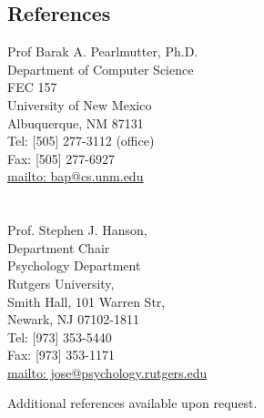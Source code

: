 \documentclass[10pt,overlapped,line]{res}
\begin{document}
\begin{resume}
 \section{References}
  \begin{multicols}{2}
 {\small
    Prof Barak A. Pearlmutter, Ph.D. \\
    Department of Computer Science \\
    FEC 157 \\
    University of New Mexico \\
    Albuquerque, NM  87131 \\
    Tel: [505] 277-3112 (office) \\
    Fax: [505] 277-6927 \\
    \href{URL}{mailto: bap@cs.unm.edu} \\
 \\
 \\
    Prof. Stephen J. Hanson, \\
    Department Chair \\
    Psychology Department \\
    Rutgers University, \\
    Smith Hall, 101 Warren Str, \\
    Newark, NJ 07102-1811 \\
    Tel: [973] 353-5440 \\
    Fax: [973] 353-1171 \\
    \href{URL}{mailto: jose@psychology.rutgers.edu} \\
 }
 \end{multicols}

Additional references available upon request.



\end{resume}
\end{document}
